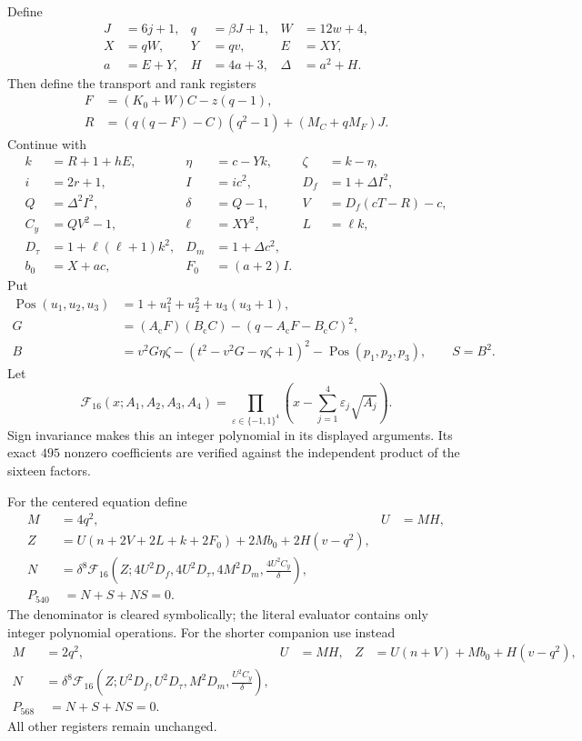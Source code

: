 Define
\begin{align*}
 J&=6j+1,&q&=\beta J+1,&W&=12w+4,\\
 X&=qW,&Y&=qv,&E&=XY,\\
 a&=E+Y,&H&=4a+3,&\Delta&=a^2+H.
\end{align*}
Then define the transport and rank registers
\begin{align*}
 F&=(K_0+W)C-z(q-1),\\
 R&=(q(q-F)-C)(q^2-1)+(M_C+qM_F)J.
\end{align*}
Continue with
\begin{align*}
 k&=R+1+hE,&\eta&=c-Yk,&\zeta&=k-\eta,\\
 i&=2r+1,&I&=ic^2,&D_f&=1+\Delta I^2,\\
 Q&=\Delta^2I^2,&\delta&=Q-1,&V&=D_f(cT-R)-c,\\
 C_y&=QV^2-1,&\ell&=XY^2,&L&=\ell k,\\
 D_\tau&=1+\ell(\ell+1)k^2,&D_m&=1+\Delta c^2,\\
 b_0&=X+ac,&F_0&=(a+2)I.
\end{align*}
Put
\begin{align*}
 \operatorname{Pos}(u_1,u_2,u_3)&=1+u_1^2+u_2^2+u_3(u_3+1),\\
 G&=(A_{\mathrm c}F)(B_{\mathrm c}C)
       -(q-A_{\mathrm c}F-B_{\mathrm c}C)^2,\\
 B&=v^2G\eta\zeta-(t^2-v^2G-\eta\zeta+1)^2
       -\operatorname{Pos}(p_1,p_2,p_3),\qquad S=B^2.
\end{align*}
Let
\[
 \mathcal F_{16}(x;A_1,A_2,A_3,A_4)
 =\prod_{\varepsilon\in\{-1,1\}^4}
       \left(x-\sum_{j=1}^4\varepsilon_j\sqrt{A_j}\right).
\]
Sign invariance makes this an integer polynomial in its displayed
arguments. Its exact $495$ nonzero coefficients are verified against the
independent product of the sixteen factors.

For the centered equation define
\begin{align*}
 M&=4q^2,&U&=MH,\\
 Z&=U(n+2V+2L+k+2F_0)+2Mb_0+2H(v-q^2),\\
 N&=\delta^8\mathcal F_{16}
   \left(Z;4U^2D_f,4U^2D_\tau,4M^2D_m,\frac{4U^2C_y}{\delta}\right),\\
 \boxed{P_{540}}&\boxed{\;=N+S+NS=0.\;}
\end{align*}
The denominator is cleared symbolically; the literal evaluator contains
only integer polynomial operations. For the shorter companion use instead
\begin{align*}
 M&=2q^2,&U&=MH,&
 Z&=U(n+V)+Mb_0+H(v-q^2),\\
 N&=\delta^8\mathcal F_{16}
 \left(Z;U^2D_f,U^2D_\tau,M^2D_m,\frac{U^2C_y}{\delta}\right),\\
 \boxed{P_{568}}&\boxed{\;=N+S+NS=0.\;}
\end{align*}
All other registers remain unchanged.


